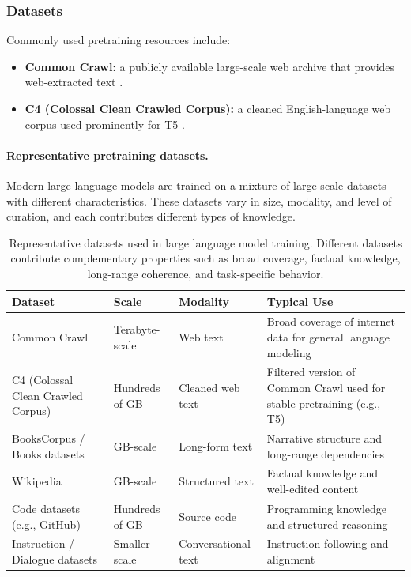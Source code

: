 \documentclass{article}
\begin{document}
\subsubsection{Datasets}
Commonly used pretraining resources include:
\begin{itemize}
    \item \textbf{Common Crawl:} a publicly available large-scale web archive that provides web-extracted text \cite{commoncrawl}.
    \item \textbf{C4 (Colossal Clean Crawled Corpus):} a cleaned English-language web corpus used prominently for T5 \cite{raffel2020t5}.
\end{itemize}

\paragraph{Representative pretraining datasets.}
Modern large language models are trained on a mixture of large-scale datasets with different characteristics. These datasets vary in size, modality, and level of curation, and each contributes different types of knowledge.

\begin{table}[H]
\centering
\begin{tabular}{|p{3cm}|p{2.5cm}|p{2.5cm}|p{4cm}|}
\hline
\textbf{Dataset} & \textbf{Scale} & \textbf{Modality} & \textbf{Typical Use} \\
\hline
Common Crawl & Terabyte-scale & Web text & Broad coverage of internet data for general language modeling \\
\hline
C4 (Colossal Clean Crawled Corpus) & Hundreds of GB & Cleaned web text & Filtered version of Common Crawl used for stable pretraining (e.g., T5) \\
\hline
BooksCorpus / Books datasets & GB-scale & Long-form text & Narrative structure and long-range dependencies \\
\hline
Wikipedia & GB-scale & Structured text & Factual knowledge and well-edited content \\
\hline
Code datasets (e.g., GitHub) & Hundreds of GB & Source code & Programming knowledge and structured reasoning \\
\hline
Instruction / Dialogue datasets & Smaller-scale & Conversational text & Instruction following and alignment \\
\hline
\end{tabular}
\caption{Representative datasets used in large language model training. Different datasets contribute complementary properties such as broad coverage, factual knowledge, long-range coherence, and task-specific behavior.}
\label{tab:llm_datasets}
\end{table}
\end{document}
